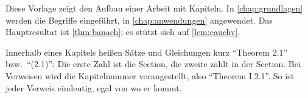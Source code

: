 \label{chap:einleitung}

Diese Vorlage zeigt den Aufbau einer Arbeit mit Kapiteln. In
\cref{chap:grundlagen} werden die Begriffe eingeführt, in
\cref{chap:anwendungen} angewendet. Das Hauptresultat ist
\cref{thm:banach}; es stützt sich auf \cref{lem:cauchy}.

Innerhalb eines Kapitels heißen Sätze und Gleichungen kurz
\enquote{Theorem 2.1} bzw.\ \enquote{(2.1)}: Die erste Zahl ist die
Section, die zweite zählt in der Section. Bei Verweisen wird die
Kapitelnummer vorangestellt, also \enquote{Theorem I.2.1}. So ist jeder
Verweis eindeutig, egal von wo er kommt.
